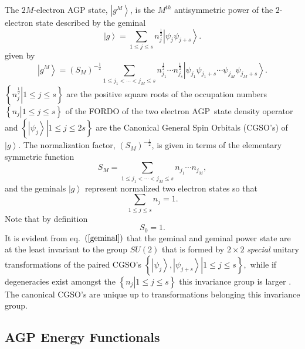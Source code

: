 \documentclass[aps,preprint]{revtex4}%
\begin{document}
The $2M$-electron AGP state, $\left\vert g^{M}\right\rangle $, is the $M^{th}$
antisymmetric power of the $2$-electron state described by the geminal
\begin{equation}
\left\vert g\right\rangle =\sum_{1\leq j\leq s}n_{j}^{\frac{1}{2}}\left\vert
\psi_{j}\psi_{j+s}\right\rangle .\label{geminal}%
\end{equation}
given by
\begin{equation}
\left\vert g^{M}\right\rangle =\left(  S_{M}\right)  ^{-\frac{1}{2}}%
\sum_{1\leq j_{1}<\cdots<j_{M}\leq s}n_{j_{1}}^{\frac{1}{2}}\cdots n_{j_{s}%
}^{\frac{1}{2}}\left\vert \psi_{j_{1}}\psi_{j_{1}+s}\cdots\psi_{j_{M}}%
\psi_{j_{M}+s}\right\rangle .\label{agp}%
\end{equation}
$\left\{  \left.  n_{j}^{\frac{1}{2}}\right\vert 1\leq j\leq s\right\}  $ are
the positive square roots of the occupation numbers $\left\{  \left.
n_{j}\right\vert 1\leq j\leq s\right\}  $ of the FORDO of the two electron
AGP\ state density operator and $\left\{  \left.  \left\vert \psi
_{j}\right\rangle \right\vert 1\leq j\leq2s\right\}  $ are the Canonical
General Spin Orbitals (CGSO's) of $\left\vert g\right\rangle .$ The
normalization factor, $\left(  S_{M}\right)  ^{-\frac{1}{2}}$, is given in
terms of the elementary symmetric function
\begin{equation}
S_{M}=\sum_{1\leq j_{1}<\cdots<j_{M}\leq s}n_{j_{1}}\cdots n_{j_{M}},
\end{equation}
and the geminals $\left\vert g\right\rangle $ represent normalized two
electron states so that
\begin{equation}
\sum_{1\leq j\leq s}n_{j}=1.
\end{equation}
Note that by definition
\begin{equation}
S_{0}=1.
\end{equation}
It is evident from eq.\ $\left(  \ref{geminal}\right)  $ that the geminal and
geminal power state are at the least invariant to the group $SU\left(
2\right)  $ that is formed by $2\times2$ \emph{special} unitary
transformations of the paired CGSO's $\left\{  \left.  \left\vert \psi
_{j}\right\rangle ,\left\vert \psi_{j+s}\right\rangle \right\vert 1\leq j\leq
s\right\}  ,$ while if degeneracies exist amongst the $\left\{  \left.
n_{j}\right\vert 1\leq j\leq s\right\}  $ this invariance group is larger
\cite{AGPCoherent}. The canonical CGSO's are unique up to transformations
belonging this invariance group.

\subsection{AGP Energy Functionals\label{AGPSect}}
\end{document}
